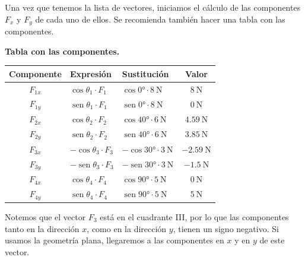 \documentclass[14pt]{extarticle}
\newcommand{\textocolor}[2]{\textbf{\textcolor{#1}{#2}}}
\renewcommand{\sin}{\operatorname{sen}}
\begin{document}
Una vez que tenemos la lista de vectores, iniciamos el cálculo de las componentes $F_{x}$ y $F_{y}$ de cada uno de ellos. Se recomienda también hacer una tabla con las componentes.

\textocolor{byzantine}{Tabla con las componentes.}
\begin{table}[H]
\centering
\begin{tabular}{c | l | l | c}
Componente & Expresión & Sustitución & Valor \\ \hline
$F_{1x}$ & $\cos \theta_{1} \cdot F_{1}$ & $\cos \ang{0} \cdot \SI{8}{\newton}$ & $\SI{8}{\newton}$ \\ \hline
$F_{1y}$ & $\sin \theta_{1} \cdot F_{1}$ & $\sin \ang{0} \cdot \SI{8}{\newton}$ & $\SI{0}{\newton}$ \\ \hline
$F_{2x}$ & $\cos \theta_{2} \cdot F_{2}$ & $\cos \ang{40} \cdot \SI{6}{\newton}$ & $\SI{4.59}{\newton}$ \\ \hline
$F_{2y}$ & $\sin \theta_{2} \cdot F_{2}$ & $\sin \ang{40} \cdot \SI{6}{\newton}$ & $\SI{3.85}{\newton}$ \\ \hline
$F_{3x}$ & $-\cos \theta_{3} \cdot F_{3}$ & $-\cos \ang{30} \cdot \SI{3}{\newton}$ & $-\SI{2.59}{\newton}$ \\ \hline
$F_{3y}$ & $-\sin \theta_{3} \cdot F_{3}$ & $-\sin \ang{30} \cdot \SI{3}{\newton}$ & $-\SI{1.5}{\newton}$ \\ \hline
$F_{4x}$ & $\cos \theta_{4} \cdot F_{4}$ & $\cos \ang{90} \cdot \SI{5}{\newton}$ & $\SI{0}{\newton}$ \\ \hline
$F_{4y}$ & $\sin \theta_{4} \cdot F_{4}$ & $\sin \ang{90} \cdot \SI{5}{\newton}$ & $\SI{5}{\newton}$ \\ \hline
\end{tabular}
\end{table}

Notemos que el vector $F_{3}$ está en el cuadrante III, por lo que las componentes tanto en la dirección $x$, como en la dirección $y$, tienen un signo negativo. Si usamos la geometría plana, llegaremos a las componentes en $x$ y en $y$ de este vector.
\end{document}
